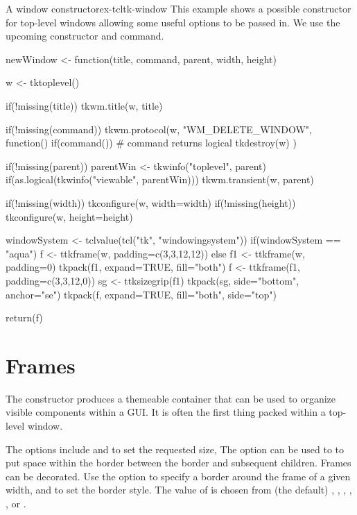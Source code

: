 \begin{example}{A window constructor}{ex-tcltk-window}
  This example shows a possible constructor for top-level windows
  allowing some useful options to be passed in. We use the upcoming
   constructor and  command.
\begin{Schunk}
\begin{Sinput}
 newWindow <- function(title, command, parent,
                       width, height) {
   w <- tktoplevel()
 
   if(!missing(title)) tkwm.title(w, title)
 
   if(!missing(command)) 
     tkwm.protocol(w, "WM_DELETE_WINDOW", function() {
       if(command())            # command returns logical
         tkdestroy(w)
     })
 
   if(!missing(parent)) {
     parentWin <- tkwinfo("toplevel", parent)
     if(as.logical(tkwinfo("viewable", parentWin))) {
       tkwm.transient(w, parent)
     }
   }
   
   if(!missing(width)) tkconfigure(w, width=width)
   if(!missing(height)) tkconfigure(w, height=height)
 
   windowSystem <- tclvalue(tcl("tk", "windowingsystem"))
   if(windowSystem == "aqua") {
     f <- ttkframe(w, padding=c(3,3,12,12))
   } else {
     f1 <- ttkframe(w, padding=0)
     tkpack(f1, expand=TRUE, fill="both")
     f <- ttkframe(f1, padding=c(3,3,12,0))
     sg <- ttksizegrip(f1)
     tkpack(sg, side="bottom", anchor="se")
   }
   tkpack(f, expand=TRUE, fill="both", side="top")
 
   return(f)
 }
\end{Sinput}
\end{Schunk}
\end{example}

\section{Frames}
\label{sec:tcltk:frames}

The  constructor produces a themeable container
that can be used to organize visible components within a GUI. It is
often the first thing packed within a top-level window. 

The options include  and
 to set the requested size,
The 
option can be used to to put space within the border between the
border and subsequent children. Frames can be decorated. Use the
option  to specify a border around the frame of
a given width, and  to set the border
style. The value of  is chosen from (the default)
, , , ,
, or .  

